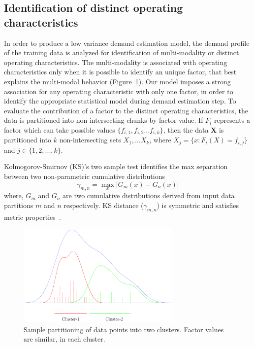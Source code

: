\documentclass[twoside,leqno,twocolumn]{article}
\begin{document}
\subsection{Identification of distinct operating characteristics}
\label{subsec:characteristic}
In order to produce a low variance demand estimation model, the demand profile of the training data is analyzed for identification of multi-modality or distinct operating characteristics. The multi-modality is associated with operating characteristics only when it is possible to identify an unique factor, that best explains the multi-modal behavior (Figure~\ref{fig2}). Our model imposes a strong association for any operating characteristic with only one factor, in order to identify the appropriate statistical model during demand estimation step. To evaluate the contribution of a factor to the distinct operating characteristics, the data is partitioned into non-intersecting chunks by factor value. If $F_i$ represents a factor which can take possible values $\lbrace f_{i,1}, f_{i,2} \dots f_{i,k} \rbrace$, then the data $\mathbf{X}$ is partitioned into $k$ non-intersecting sets $X_1 , \dots X_k$, where $X_{j} = \lbrace x: F_i(X) = f_{i,j} \rbrace $ and $j \in \{1,2,...,k\}$.
\par 
Kolmogorov-Smirnov (KS)'s two sample test identifies the max separation between two non-parametric cumulative distributions
\begin{equation*} 
 \gamma_{m,n} = \max_{x}{\vert G_{m}(x) - G_{n}(x) \vert}
\end{equation*}
where, $G_{m}$ and $G_{n}$ are two cumulative distributions derived from input data partitions $m$ and $n$ respectively. KS distance ($\gamma_{m,n}$) is symmetric and satisfies metric properties~\cite{degroot2002}. 

\begin{figure}[t]
	\centering
	\includegraphics[width=8cm]{fig2.pdf}
	\caption{Sample partitioning of data points into two clusters. Factor values are similar, in each cluster.}
    \label{fig2}
\end{figure}
\end{document}
